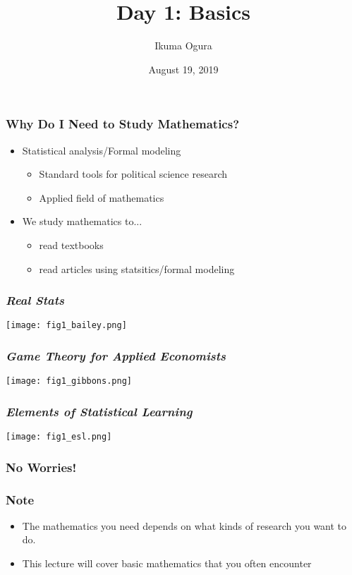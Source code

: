 \documentclass[pdflatex, 12pt]{beamer}
\title[Math Camp: Day 1]{Day 1: Basics}
\author[Ikuma Ogura]{Ikuma Ogura}
\institute[Georgetown]{Ph.D. student, Department of Government, Georgetown University}
\date[August 19, 2019]{August 19, 2019}
\begin{document}
\begin{frame}
\frametitle{}
\titlepage
\end{frame}

\begin{frame}
\frametitle{Why Do I Need to Study Mathematics?}
\begin{itemize}
\item Statistical analysis/Formal modeling
 \begin{itemize}
 \item Standard tools for political science research
 \item Applied field of mathematics
 \end{itemize}
\vspace{0.4cm}
\item We study mathematics to...
 \begin{itemize}
 \item read textbooks
 \item read articles using statsitics/formal modeling
 \end{itemize}
\end{itemize}
\end{frame}

\begin{frame}
\frametitle{\emph{Real Stats}}
\centering
\texttt{[image: fig1\_bailey.png]}
\end{frame}

\begin{frame}
\frametitle{\emph{Game Theory for Applied Economists}}
\centering
\texttt{[image: fig1\_gibbons.png]}
\end{frame}

\begin{frame}
\frametitle{\emph{Elements of Statistical Learning}}
\centering
\texttt{[image: fig1\_esl.png]}
\end{frame}

\begin{frame}
\frametitle{No Worries!}
\centering
{}
\end{frame}

\begin{frame}
\frametitle{Note}
\begin{itemize}
\item The mathematics you need depends on what kinds of research you want to do.
\vspace{0.4cm}
\item This lecture will cover basic mathematics that you often encounter
\end{itemize}
\end{frame}
\end{document}
